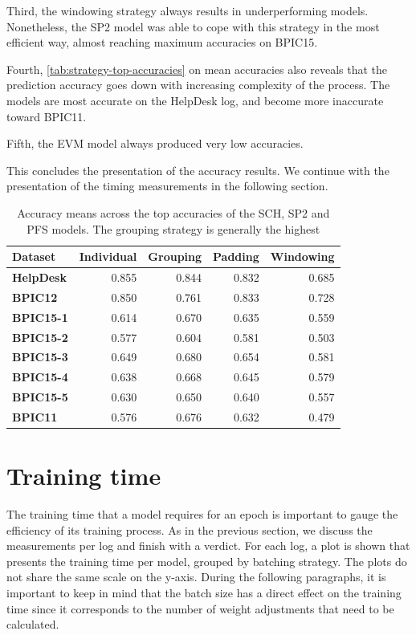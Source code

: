 Third, the windowing strategy always results in underperforming models.
Nonetheless, the SP2 model was able to cope with this strategy in the most efficient way, almost reaching maximum accuracies on BPIC15.

Fourth, \autoref{tab:strategy-top-accuracies} on mean accuracies also reveals that the prediction accuracy goes down with increasing complexity of the process.
The models are most accurate on the HelpDesk log, and become more inaccurate toward BPIC11.

Fifth, the EVM model always produced very low accuracies.

This concludes the presentation of the accuracy results.
We continue with the presentation of the timing measurements in the following section.

\begin{table}
\centering
\begin{tabular}{lrrrr}
\textbf{Dataset}  &  \textbf{Individual} &  \textbf{Grouping} &   \textbf{Padding} &  \textbf{Windowing}\\
\midrule
\textbf{HelpDesk} &    0.855    &  0.844    &  0.832    &  0.685    \\
\textbf{BPIC12  } &    0.850    &  0.761    &  0.833    &  0.728    \\
\textbf{BPIC15-1} &    0.614    &  0.670    &  0.635    &  0.559    \\
\textbf{BPIC15-2} &    0.577    &  0.604    &  0.581    &  0.503    \\
\textbf{BPIC15-3} &    0.649    &  0.680    &  0.654    &  0.581    \\
\textbf{BPIC15-4} &    0.638    &  0.668    &  0.645    &  0.579    \\
\textbf{BPIC15-5} &    0.630    &  0.650    &  0.640    &  0.557    \\
\textbf{BPIC11  } &    0.576    &  0.676    &  0.632    &  0.479    \\
\end{tabular}
\caption[Grouping strategy leads to best mean accuracies]{Accuracy means across the top accuracies of the SCH, SP2 and PFS models. The grouping strategy is generally the highest}
\label{tab:strategy-top-accuracies}
\end{table}
\FloatBarrier

\section{Training time}\label{sec:eval:training-time}
The training time that a model requires for an epoch is important to gauge the efficiency of its training process.
As in the previous section, we discuss the measurements per log and finish with a verdict.
For each log, a plot is shown that presents the training time per model, grouped by batching strategy.
The plots do not share the same scale on the y-axis.
During the following paragraphs, it is important to keep in mind that the batch size has a direct effect on the training time since it corresponds to the number of weight adjustments that need to be calculated.

